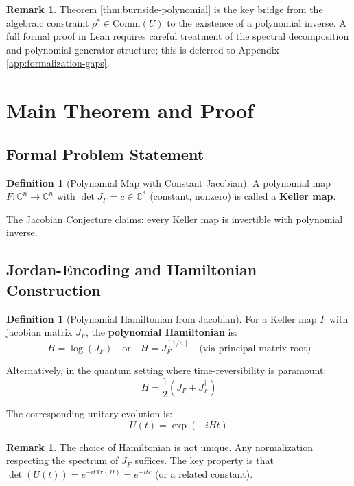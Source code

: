 \documentclass[11pt,a4paper]{article}
\theoremstyle{plain}
\theoremstyle{definition}
\newtheorem{definition}[theorem]{Definition}
\newtheorem{remark}[theorem]{Remark}
\newcommand{\CC}{\mathbb{C}}
\newcommand{\Tr}{\mathrm{Tr}}
\newcommand{\Com}[1]{\mathrm{Comm}(#1)}
\begin{document}
\begin{remark}
Theorem \ref{thm:burnside-polynomial} is the key bridge from the algebraic constraint $\rho^* \in \Com{U}$ to the existence of a polynomial inverse. A full formal proof in Lean requires careful treatment of the spectral decomposition and polynomial generator structure; this is deferred to Appendix \ref{app:formalization-gaps}.
\end{remark}

\section{Main Theorem and Proof}
\label{sec:main}

\subsection{Formal Problem Statement}

\begin{definition}[Polynomial Map with Constant Jacobian]
A polynomial map $F: \CC^n \to \CC^n$ with $\det J_F = c \in \CC^*$ (constant, nonzero) is called a \textbf{Keller map}.
\end{definition}

The Jacobian Conjecture claims: every Keller map is invertible with polynomial inverse.

\subsection{Jordan-Encoding and Hamiltonian Construction}

\begin{definition}[Polynomial Hamiltonian from Jacobian]
\label{def:hamiltonian-encoding}
For a Keller map $F$ with jacobian matrix $J_F$, the \textbf{polynomial Hamiltonian} is:
$$H = \log(J_F) \quad \text{or} \quad H = J_F^{(1/n)} \quad \text{(via principal matrix root)}$$

Alternatively, in the quantum setting where time-reversibility is paramount:
$$H = \frac{1}{2}(J_F + J_F^\dagger)$$

The corresponding unitary evolution is:
$$U(t) = \exp(-iHt)$$
\end{definition}

\begin{remark}
The choice of Hamiltonian is not unique. Any normalization respecting the spectrum of $J_F$ suffices. The key property is that $\det(U(t)) = e^{-i t \Tr(H)} = e^{-i t c}$ (or a related constant).
\end{remark}
\end{document}
